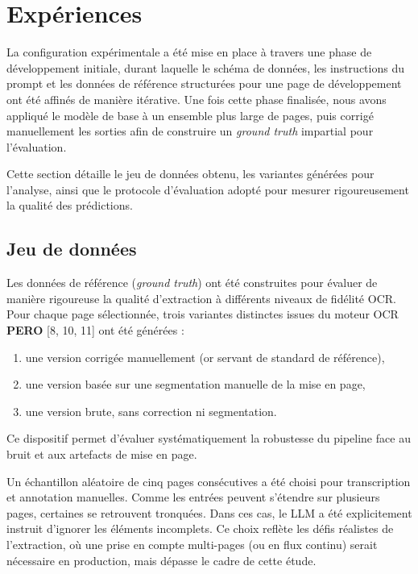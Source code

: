 \section{Expériences}

La configuration expérimentale a été mise en place à travers une phase de développement initiale, durant laquelle le schéma de données, les instructions du prompt et les données de référence structurées pour une page de développement ont été affinés de manière itérative. Une fois cette phase finalisée, nous avons appliqué le modèle de base à un ensemble plus large de pages, puis corrigé manuellement les sorties afin de construire un \emph{ground truth} impartial pour l’évaluation.

Cette section détaille le jeu de données obtenu, les variantes générées pour l’analyse, ainsi que le protocole d’évaluation adopté pour mesurer rigoureusement la qualité des prédictions.

\subsection{Jeu de données}

Les données de référence (\emph{ground truth}) ont été construites pour évaluer de manière rigoureuse la qualité d’extraction à différents niveaux de fidélité OCR. Pour chaque page sélectionnée, trois variantes distinctes issues du moteur OCR \textbf{PERO} [8, 10, 11] ont été générées :

\begin{enumerate}
\item une version corrigée manuellement (or servant de standard de référence),
\item une version basée sur une segmentation manuelle de la mise en page,
\item une version brute, sans correction ni segmentation.

\end{enumerate}
Ce dispositif permet d’évaluer systématiquement la robustesse du pipeline face au bruit et aux artefacts de mise en page.

Un échantillon aléatoire de cinq pages consécutives a été choisi pour transcription et annotation manuelles. Comme les entrées peuvent s’étendre sur plusieurs pages, certaines se retrouvent tronquées. Dans ces cas, le LLM a été explicitement instruit d’ignorer les éléments incomplets. Ce choix reflète les défis réalistes de l’extraction, où une prise en compte multi-pages (ou en flux continu) serait nécessaire en production, mais dépasse le cadre de cette étude.

